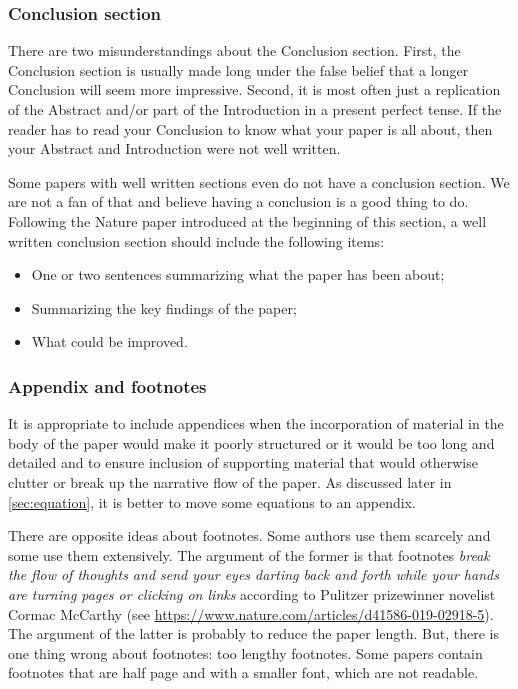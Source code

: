 \documentclass[authoryear,3p,times,preprint,review,fleqn]{elsarticle}
\numberwithin{equation}{section}
\theoremstyle{remark}
\begin{document}
\subsubsection{Conclusion section}\label{sec:conclusion-part}

There are two misunderstandings about the Conclusion section. First, the Conclusion section is usually made long under the false belief that a longer Conclusion will seem more impressive. Second, it is most often just a replication of the Abstract and/or part of the Introduction in a present perfect tense. If the reader has to read your Conclusion to know what your paper is all about, then your Abstract and Introduction were not well written.

Some papers with well written sections even do not have a conclusion section. We are not a fan of that and believe having a conclusion is a good thing to do. Following the Nature paper introduced at the beginning of this section, a well written conclusion section should include the following items:

\begin{itemize}
\item One or two sentences summarizing what the paper has been about;
\item Summarizing the key findings of the paper;
\item What could be improved.
\end{itemize}

\subsubsection{Appendix and footnotes}\label{sec:appendix-footnotes}

It is appropriate to include appendices when
the incorporation of material in the body of the paper would make it poorly structured or it would be too long and detailed and to ensure inclusion of supporting material that would otherwise clutter or break up the narrative flow of the paper.
As discussed later in \cref{sec:equation}, it is better to move some equations to an appendix.

There are opposite ideas about footnotes. Some authors use them scarcely and some use them extensively. The argument of the former is that footnotes \textit{break the flow of thoughts and send your eyes darting back and forth while your hands are turning pages or clicking on links} according to Pulitzer prizewinner novelist Cormac McCarthy (see \url{https://www.nature.com/articles/d41586-019-02918-5}). The argument of the latter is probably to reduce the paper length. But, there is one thing wrong about footnotes: too lengthy footnotes. Some papers contain footnotes that are half page and with a smaller font, which are not readable.
\end{document}
